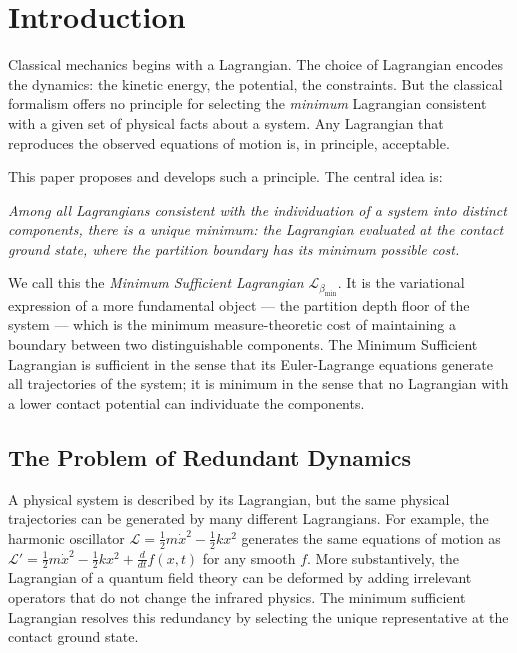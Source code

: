 \documentclass[12pt, a4paper]{article}
\theoremstyle{plain}
\theoremstyle{definition}
\theoremstyle{remark}
\newcommand{\bmin}{\beta_{\min}}
\newcommand{\Lmin}{\mathcal{L}_{\bmin}}
\newcommand{\half}{\tfrac{1}{2}}
\begin{document}
\tableofcontents
\newpage

\section{Introduction}
\label{sec:introduction}

Classical mechanics begins with a Lagrangian. The choice of Lagrangian encodes
the dynamics: the kinetic energy, the potential, the constraints. But the
classical formalism offers no principle for selecting the \emph{minimum}
Lagrangian consistent with a given set of physical facts about a system. Any
Lagrangian that reproduces the observed equations of motion is, in principle,
acceptable.

This paper proposes and develops such a principle. The central idea is:

\begin{center}
\emph{Among all Lagrangians consistent with the individuation of a system into
distinct components, there is a unique minimum: the Lagrangian evaluated at the
contact ground state, where the partition boundary has its minimum possible
cost.}
\end{center}

We call this the \emph{Minimum Sufficient Lagrangian} $\Lmin$. It is the
variational expression of a more fundamental object --- the partition depth
floor of the system --- which is the minimum measure-theoretic cost of
maintaining a boundary between two distinguishable components. The Minimum
Sufficient Lagrangian is sufficient in the sense that its Euler-Lagrange
equations generate all trajectories of the system; it is minimum in the sense
that no Lagrangian with a lower contact potential can individuate the components.

\subsection{The Problem of Redundant Dynamics}

A physical system is described by its Lagrangian, but the same physical
trajectories can be generated by many different Lagrangians. For example, the
harmonic oscillator $\mathcal{L} = \half m\dot{x}^2 - \half kx^2$ generates
the same equations of motion as $\mathcal{L}' = \half m\dot{x}^2 - \half kx^2
+ \frac{d}{dt}f(x,t)$ for any smooth $f$. More substantively, the Lagrangian of
a quantum field theory can be deformed by adding irrelevant operators that do not
change the infrared physics. The minimum sufficient Lagrangian resolves this
redundancy by selecting the unique representative at the contact ground state.
\end{document}
